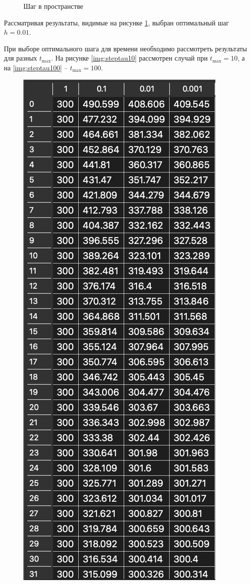 \begin{enumerate}
\begin{figure}[H]
            \caption{Шаг в пространстве}
            \label{img:steph}
        \end{figure}

        Рассматривая результаты, видимые на рисунке \ref{img:steph}, выбран оптимальный шаг $h = 0.01$.

        При выборе оптимального шага для времени необходимо рассмотреть результаты для разных $t_\text{max}$. На рисунке \ref{img:steptau10} рассмотрен случай при $t_\text{max} = 10$, а на \ref{img:steptau100} -- $t_\text{max} = 100$.

        \begin{minipage}{0.5\textwidth}
            \begin{flushleft}
                \begin{figure}[H]
                    \centering
                    \includegraphics[scale=0.60]{img/steptau10.png}

\end{figure}
\end{flushleft}
\end{minipage}
\end{enumerate}
